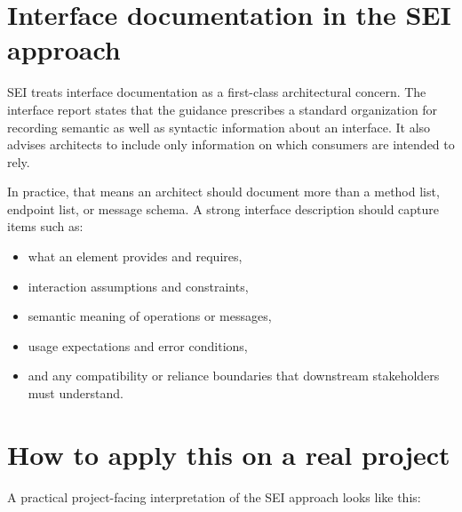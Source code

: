 \documentclass[11pt]{article}
\begin{document}
\section*{Interface documentation in the SEI approach}

SEI treats interface documentation as a first-class architectural concern. The interface report states that the guidance prescribes a standard organization for recording semantic as well as syntactic information about an interface. It also advises architects to include only information on which consumers are intended to rely.\cite{sei-interfaces}

In practice, that means an architect should document more than a method list, endpoint list, or message schema. A strong interface description should capture items such as:

\begin{itemize}
    \item what an element provides and requires,
    \item interaction assumptions and constraints,
    \item semantic meaning of operations or messages,
    \item usage expectations and error conditions,
    \item and any compatibility or reliance boundaries that downstream stakeholders must understand.\cite{sei-interfaces}
\end{itemize}

\section*{How to apply this on a real project}

A practical project-facing interpretation of the SEI approach looks like this:
\end{document}
